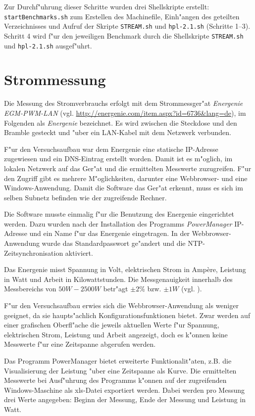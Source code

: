 \noindent
Zur Durchf"uhrung dieser Schritte wurden drei Shellskripte erstellt: \texttt{startBenchmarks.sh} zum Erstellen des Machinefile, Einh"angen des geteilten Verzeichnisses und Aufruf der Skripte \texttt{STREAM.sh} und \texttt{hpl-2.1.\-sh} (Schritte 1--3). Schritt 4 wird f"ur den jeweiligen Benchmark durch die Shellskripte \texttt{STREAM.sh} und \texttt{hpl-2.1.sh} ausgef"uhrt.

\section{Strommessung}
Die Messung des Stromverbrauchs erfolgt mit dem Strommessger"at \textit{Energenie EGM-PWM-LAN} (vgl. \url{http://energenie.com/item.aspx?id=6736&lang=de}), im Folgenden als \textit{Energenie} bezeichnet. Es wird zwischen die Steckdose und den Bramble gesteckt und "uber ein LAN-Kabel mit dem Netzwerk verbunden. 

F"ur den Versuchsaufbau war dem Energenie eine statische IP-Adresse zugewiesen und ein DNS-Eintrag erstellt worden. Damit ist es m"oglich, im lokalen Netzwerk auf das Ger"at und die ermittelten Messwerte zuzugreifen. F"ur den Zugriff gibt es mehrere M"oglichkeiten, darunter eine Webbrowser- und eine Windows-Anwendung. Damit die Software das Ger"at erkennt, muss es sich im selben Subnetz befinden wie der zugreifende Rechner. 

Die Software musste einmalig f"ur die Benutzung des Energenie eingerichtet werden. Dazu wurden nach der Installation des Programms \textit{PowerManager} IP-Adresse und ein Name f"ur das Energenie eingetragen. In der Webbrowser-Anwendung wurde das Standardpasswort ge"andert und die NTP-Zeitsynchronisation aktiviert. 

Das Energenie misst Spannung in Volt, elektrischen Strom in Amp\`{e}re, Leistung in Watt und Arbeit in Kilowattstunden. Die Messgenauigkeit innerhalb des Messbereichs von $50 W - 2500 W$ betr"agt $\pm 2\%$ bzw. $\pm 1 W$ (vgl. \cite{scrguide03}). %

F"ur den Versuchsaufbau erwies sich die Webbrowser-Anwendung als weniger geeignet, da sie haupts"achlich Konfigurationsfunktionen bietet. Zwar werden auf einer grafischen Oberfl"ache die jeweils aktuellen Werte f"ur Spannung, elektrischen Strom, Leistung und Arbeit angezeigt, doch es k"onnen keine Messwerte f"ur eine Zeitspanne abgerufen werden. 

Das Programm PowerManager bietet erweiterte Funktionalit"aten, z.B. die Visualisierung der Leistung "uber eine Zeitspanne als Kurve. Die ermittelten Messwerte bei Ausf"uhrung des Programms k"onnen auf der zugreifenden Windows-Maschine als xls-Datei exportiert werden. Dabei werden pro Messung drei Werte angegeben: Beginn der Messung, Ende der Messung und Leistung in Watt. 

